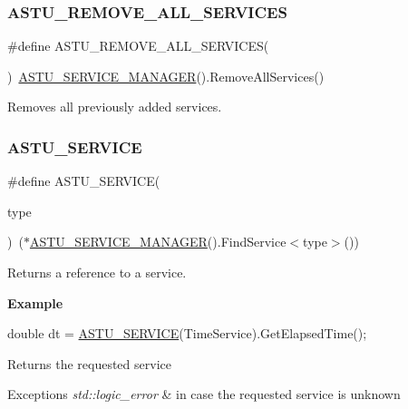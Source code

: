 \subsubsection{\texorpdfstring{A\+S\+T\+U\+\_\+\+R\+E\+M\+O\+V\+E\+\_\+\+A\+L\+L\+\_\+\+S\+E\+R\+V\+I\+C\+ES}{ASTU\_REMOVE\_ALL\_SERVICES}}
{\footnotesize\ttfamily \#define A\+S\+T\+U\+\_\+\+R\+E\+M\+O\+V\+E\+\_\+\+A\+L\+L\+\_\+\+S\+E\+R\+V\+I\+C\+ES(\begin{DoxyParamCaption}{ }\end{DoxyParamCaption})~\hyperlink{group__srv__group_ga5216c57cf872d6a0c05d0e6f33c66fc7}{A\+S\+T\+U\+\_\+\+S\+E\+R\+V\+I\+C\+E\+\_\+\+M\+A\+N\+A\+G\+ER}().Remove\+All\+Services()}

Removes all previously added services. \mbox{\label{group__srv__group_ga42575546f01bf92989d08916564ffc66}} 
\subsubsection{\texorpdfstring{A\+S\+T\+U\+\_\+\+S\+E\+R\+V\+I\+CE}{ASTU\_SERVICE}}
{\footnotesize\ttfamily \#define A\+S\+T\+U\+\_\+\+S\+E\+R\+V\+I\+CE(\begin{DoxyParamCaption}\item[{}]{type }\end{DoxyParamCaption})~($\ast$\hyperlink{group__srv__group_ga5216c57cf872d6a0c05d0e6f33c66fc7}{A\+S\+T\+U\+\_\+\+S\+E\+R\+V\+I\+C\+E\+\_\+\+M\+A\+N\+A\+G\+ER}().Find\+Service$<$type$>$())}

Returns a reference to a service.

{\bfseries Example}


\begin{DoxyCode}
\textcolor{keywordtype}{double} dt = \hyperlink{group__srv__group_ga42575546f01bf92989d08916564ffc66}{ASTU\_SERVICE}(TimeService).GetElapsedTime();
\end{DoxyCode}


\begin{DoxyReturn}{Returns}
the requested service 
\end{DoxyReturn}

\begin{DoxyExceptions}{Exceptions}
{\em std\+::logic\+\_\+error} & in case the requested service is unknown \\
\hline
\end{DoxyExceptions}
\mbox{\label{group__srv__group_ga5216c57cf872d6a0c05d0e6f33c66fc7}} 
